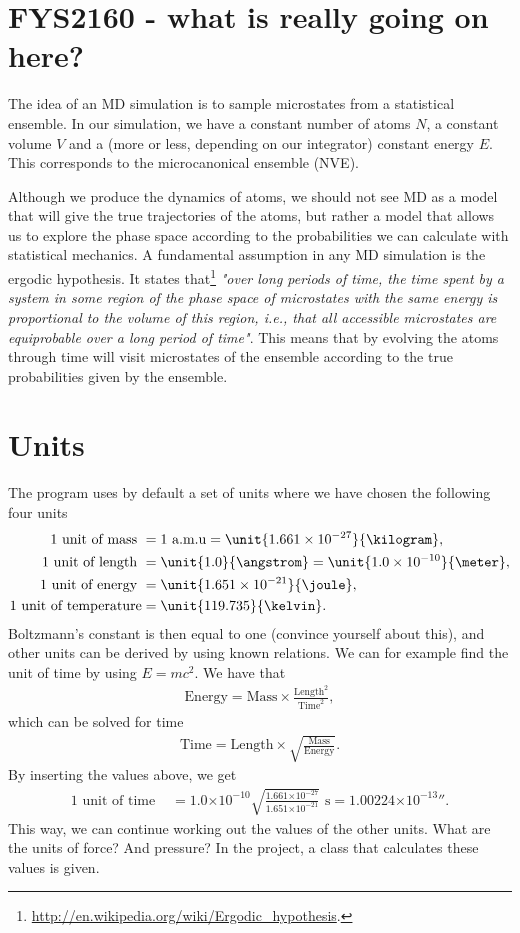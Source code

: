 \documentclass[11pt,a4wide]{article}
\providecommand{\e}[1]{\ensuremath{\times 10^{#1}}}
\begin{document}
\begin{appendices}
\section{FYS2160 - what is really going on here?}
The idea of an MD simulation is to sample microstates from a statistical ensemble. In our simulation, we have a constant number of atoms $N$, a constant volume $V$ and a (more or less, depending on our integrator) constant energy $E$. This corresponds to the microcanonical ensemble (NVE). 

Although we produce the dynamics of atoms, we should not see MD as a model that will give the true trajectories of the atoms, but rather a model that allows us to explore the phase space according to the probabilities we can calculate with statistical mechanics. A fundamental assumption in any MD simulation is the ergodic hypothesis. It states that\footnote{\url{http://en.wikipedia.org/wiki/Ergodic_hypothesis}.} \textit{"over long periods of time, the time spent by a system in some region of the phase space of microstates with the same energy is proportional to the volume of this region, i.e., that all accessible microstates are equiprobable over a long period of time"}. This means that by evolving the atoms through time will visit microstates of the ensemble according to the true probabilities given by the ensemble.

\section{Units}
\label{sec:units}
The program uses by default a set of units where we have chosen the following four units
\begin{align}
	\text{1 unit of mass } &= 1 \text{ a.m.u} = \unit{1.661\e{-27}}{\kilogram},\\
	\text{1 unit of length } &= \unit{1.0}{\angstrom} = \unit{1.0\e{-10}}{\meter},\\
	\text{1 unit of energy } &= \unit{1.651\e{-21}}{\joule},\\
	\text{1 unit of temperature} &= \unit{119.735}{\kelvin}.
\end{align}
Boltzmann's constant is then equal to one (convince yourself about this), and other units can be derived by using known relations. We can for example find the unit of time by using $E=mc^2$. We have that
\begin{align}
	\text{Energy} = \text{Mass} \times \frac{\text{Length}^2}{\text{Time}^2},
\end{align}
which can be solved for time
\begin{align}
	\text{Time} = \text{Length} \times \sqrt{\frac{\text{Mass}}{\text{Energy}}}.
\end{align}
By inserting the values above, we get 
\begin{align}
	\text{1 unit of time } &= 1.0 \e{-10}\sqrt{\frac{1.661\e{-27}}{1.651\e{-21}}} \text{ s} = \unit{1.00224\e{-13}}{\second}.
\end{align}
This way, we can continue working out the values of the other units. What are the units of force? And pressure? In the project, a class that calculates these values is given.


\end{appendices}
\end{document}
